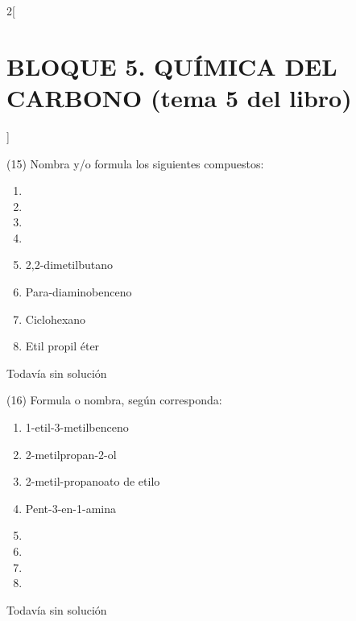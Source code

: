 \documentclass[10pt]{article}
\begin{document}
\begin{multicols}{2}[
  \section{BLOQUE 5. QUÍMICA DEL CARBONO (tema 5 del libro)}
  ]
\begin{exercise}[
    tags    = {},
    topics  = {química,química básica},
    source  = {FQ 1B MGH 2016, p85, e26},
  ]
  (15) Nombra y/o formula los siguientes compuestos:
  \begin{enumerate}
    \item {}
    \item {}
    \item {}
    \item {}
    \item 2,2-dimetilbutano
    \item Para-diaminobenceno
    \item Ciclohexano
    \item Etil propil éter
  \end{enumerate}
\end{exercise}

\begin{solution}[print=false]
  Todavía sin solución
\end{solution}




\begin{exercise}[
    tags    = {},
    topics  = {química,química básica},
    source  = {FQ 1B MGH 2016, p85, e26},
  ]

  (16) Formula o nombra, según corresponda:
  \begin{enumerate}
    \item 1-etil-3-metilbenceno
    \item 2-metilpropan-2-ol
    \item 2-metil-propanoato de etilo
    \item Pent-3-en-1-amina
    \item {}
    \item {}
    \item {}
    \item {}
  \end{enumerate}
\end{exercise}

\begin{solution}[print=false]
  Todavía sin solución
\end{solution}




\begin{exercise}[
    tags    = {},
    topics  = {química,química básica},
    source  = {FQ 1B MGH 2016, p85, e26},
  ]


\end{exercise}
\end{multicols}
\end{document}
